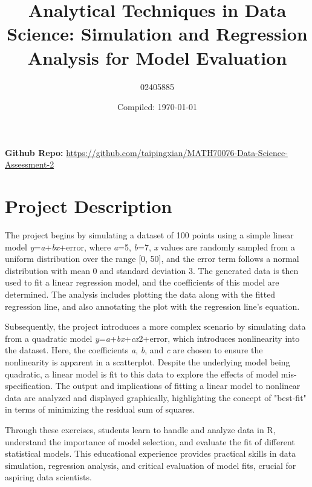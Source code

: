 \documentclass[a4paper, 12pt]{article}
\title{Analytical Techniques in Data Science: Simulation and Regression Analysis for Model Evaluation }
\author{02405885}
\date{Compiled: \today}
\begin{document}
\maketitle

\textbf{Github Repo:} \href{https://github.com/taipingxian/MATH70076-Data-Science-Assessment-2}{https://github.com/taipingxian/MATH70076-Data-Science-Assessment-2}

\section{Project Description}

The project begins by simulating a dataset of 100 points using a simple linear model \textit{y}=\textit{a}+\textit{b}\textit{x}+error, where \textit{a}=5, \textit{b}=7, \textit{x} values are randomly sampled from a uniform distribution over the range [0, 50], and the error term follows a normal distribution with mean 0 and standard deviation 3. The generated data is then used to fit a linear regression model, and the coefficients of this model are determined. The analysis includes plotting the data along with the fitted regression line, and also annotating the plot with the regression line's equation.

Subsequently, the project introduces a more complex scenario by simulating data from a quadratic model \textit{y}=\textit{a}+\textit{b}\textit{x}+\textit{c}\textit{x}2+error, which introduces nonlinearity into the dataset. Here, the coefficients \textit{a}, \textit{b}, and \textit{c} are chosen to ensure the nonlinearity is apparent in a scatterplot. Despite the underlying model being quadratic, a linear model is fit to this data to explore the effects of model mis-specification. The output and implications of fitting a linear model to nonlinear data are analyzed and displayed graphically, highlighting the concept of "best-fit" in terms of minimizing the residual sum of squares.

Through these exercises, students learn to handle and analyze data in R, understand the importance of model selection, and evaluate the fit of different statistical models. This educational experience provides practical skills in data simulation, regression analysis, and critical evaluation of model fits, crucial for aspiring data scientists.



\pagebreak
\end{document}
